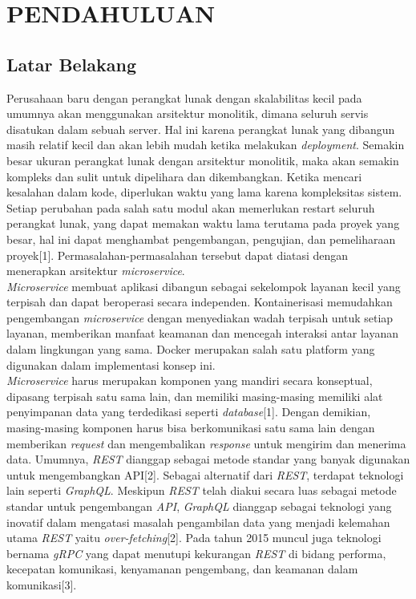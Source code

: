 \chapter{PENDAHULUAN}
\section{Latar Belakang}
Perusahaan baru dengan perangkat lunak dengan skalabilitas kecil pada umumnya akan menggunakan arsitektur monolitik, dimana seluruh servis disatukan dalam sebuah server. Hal ini karena perangkat lunak yang dibangun masih relatif kecil dan akan lebih mudah ketika melakukan \textit{deployment}.  Semakin besar ukuran perangkat lunak dengan arsitektur monolitik, maka akan semakin kompleks dan sulit untuk dipelihara dan dikembangkan. Ketika mencari kesalahan dalam kode, diperlukan waktu yang lama karena kompleksitas sistem. Setiap perubahan pada salah satu modul akan memerlukan restart seluruh perangkat lunak, yang dapat memakan waktu lama terutama pada proyek yang besar, hal ini dapat menghambat pengembangan, pengujian, dan pemeliharaan proyek[1]. Permasalahan-permasalahan tersebut dapat diatasi dengan menerapkan arsitektur \textit{microservice}.\\

\textit{Microservice} membuat aplikasi dibangun sebagai sekelompok layanan kecil yang terpisah dan dapat beroperasi secara independen. Kontainerisasi memudahkan pengembangan \textit{microservice} dengan menyediakan wadah terpisah untuk setiap layanan, memberikan manfaat keamanan dan mencegah interaksi antar layanan dalam lingkungan yang sama.  Docker merupakan salah satu platform yang digunakan dalam implementasi konsep ini.\\

\textit{Microservice} harus merupakan komponen yang mandiri secara konseptual, dipasang terpisah satu sama lain, dan memiliki masing-masing memiliki alat penyimpanan data yang terdedikasi seperti \textit{database}[1]. Dengan demikian, masing-masing komponen harus bisa berkomunikasi satu sama lain dengan memberikan \textit{request} dan mengembalikan \textit{response} untuk mengirim dan menerima data. Umumnya, \textit{REST} dianggap sebagai metode standar yang banyak digunakan untuk mengembangkan API[2]. Sebagai alternatif dari \textit{REST}, terdapat teknologi lain seperti \textit{GraphQL}. Meskipun \textit{REST} telah diakui secara luas sebagai metode standar untuk pengembangan \textit{API}, \textit{GraphQL} dianggap sebagai teknologi yang inovatif dalam mengatasi masalah pengambilan data yang menjadi kelemahan utama \textit{REST} yaitu \textit{over-fetching}[2]. Pada tahun 2015 muncul juga teknologi bernama \textit{gRPC} yang dapat menutupi kekurangan \textit{REST} di bidang performa, kecepatan komunikasi, kenyamanan pengembang, dan keamanan dalam komunikasi[3].\\

